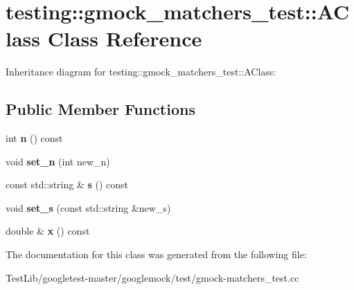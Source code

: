 \hypertarget{classtesting_1_1gmock__matchers__test_1_1AClass}{}\section{testing\+:\+:gmock\+\_\+matchers\+\_\+test\+:\+:A\+Class Class Reference}
\label{classtesting_1_1gmock__matchers__test_1_1AClass}


Inheritance diagram for testing\+:\+:gmock\+\_\+matchers\+\_\+test\+:\+:A\+Class\+:
\subsection*{Public Member Functions}
\begin{DoxyCompactItemize}
\item 
\mbox{\label{classtesting_1_1gmock__matchers__test_1_1AClass_add84ab9ef4a6bbe78719a9528bf6fb90}} 
int {\bfseries n} () const
\item 
\mbox{\label{classtesting_1_1gmock__matchers__test_1_1AClass_a3181466cec6faa5ab3c6bc5c4dbf67b2}} 
void {\bfseries set\+\_\+n} (int new\+\_\+n)
\item 
\mbox{\label{classtesting_1_1gmock__matchers__test_1_1AClass_a1645862d2061ccf04b67761314c7bb97}} 
const std\+::string \& {\bfseries s} () const
\item 
\mbox{\label{classtesting_1_1gmock__matchers__test_1_1AClass_a9e2ea4f630928618137cfaadb6298fcf}} 
void {\bfseries set\+\_\+s} (const std\+::string \&new\+\_\+s)
\item 
\mbox{\label{classtesting_1_1gmock__matchers__test_1_1AClass_ade61d438cb535d71d0dcc17a1d5bd7cd}} 
double \& {\bfseries x} () const
\end{DoxyCompactItemize}


The documentation for this class was generated from the following file\+:\begin{DoxyCompactItemize}
\item 
Test\+Lib/googletest-\/master/googlemock/test/gmock-\/matchers\+\_\+test.\+cc\end{DoxyCompactItemize}
